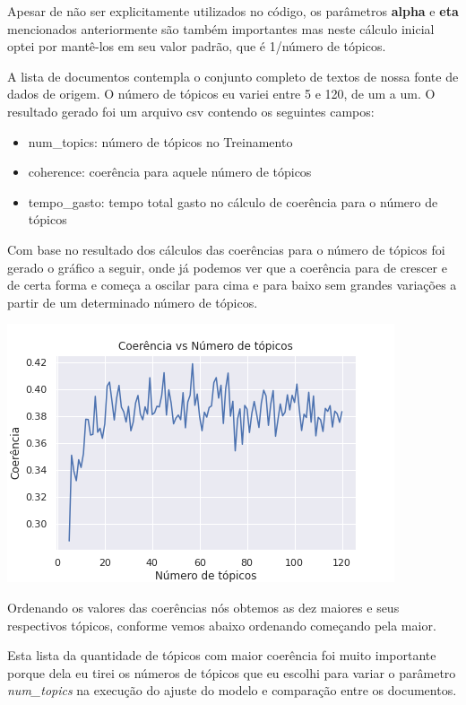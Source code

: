 Apesar de não ser explicitamente utilizados no código, os parâmetros \textbf{alpha} e \textbf{eta} mencionados anteriormente são também importantes mas neste cálculo inicial
optei por mantê-los em seu valor padrão, que é 1/número de tópicos. 

A lista de documentos contempla o conjunto completo de textos de nossa fonte de dados de origem. O número de tópicos eu variei entre 5 e 120, de um 
a um. O resultado gerado foi um arquivo csv contendo os seguintes campos:

\begin{itemize}
    \item num\_topics: número de tópicos no Treinamento
    \item coherence: coerência para aquele número de tópicos
    \item tempo\_gasto: tempo total gasto no cálculo de coerência para o número de tópicos
\end{itemize}

Com base no resultado dos cálculos das coerências para o número de tópicos foi gerado o gráfico a seguir, onde já podemos ver que a coerência para 
de crescer e de certa forma e começa a oscilar para cima e para baixo sem grandes variações a partir de um determinado número de tópicos.

\includegraphics{treinamento/resources/coerencia_vs_topicos.png}

Ordenando os valores das coerências nós obtemos as dez maiores e seus respectivos tópicos, conforme vemos abaixo ordenando começando pela maior.

Esta lista da quantidade de tópicos com maior coerência foi muito importante porque dela eu tirei os números de tópicos que eu escolhi para 
variar o parâmetro \textit{num\_topics} na execução do ajuste do modelo e comparação entre os documentos.

